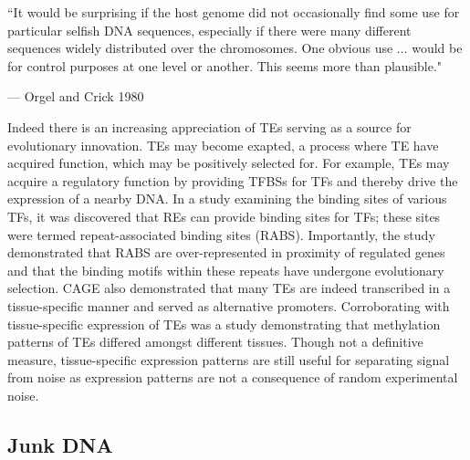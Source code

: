 \epigraph{``It would be surprising if the host genome did not occasionally find some use for particular selfish DNA sequences, especially if there were many different sequences widely distributed over the chromosomes. One obvious use $\ldots$ would be for control purposes at one level or another. This seems more than plausible."}{--- \textup{Orgel and Crick 1980}}

Indeed there is an increasing appreciation of TEs serving as a source for evolutionary innovation\cite{Muotri15102007, pmid18368054}. TEs may become exapted, a process where TE have acquired function, which may be positively selected for. For example, TEs may acquire a regulatory function by providing TFBSs for TFs and thereby drive the expression of a nearby DNA. In a study examining the binding sites of various TFs, it was discovered that REs can provide binding sites for TFs; these sites were termed repeat-associated binding sites (RABS)\cite{pmid18682548}. Importantly, the study demonstrated that RABS are over-represented in proximity of regulated genes and that the binding motifs within these repeats have undergone evolutionary selection. CAGE also demonstrated that many TEs are indeed transcribed in a tissue-specific manner and served as alternative promoters\cite{pmid19377475}. Corroborating with tissue-specific expression of TEs was a study demonstrating that methylation patterns of TEs differed amongst different tissues\cite{pmid23708189}. Though not a definitive measure, tissue-specific expression patterns are still useful for separating signal from noise as expression patterns are not a consequence of random experimental noise.

\subsection{Junk DNA}

